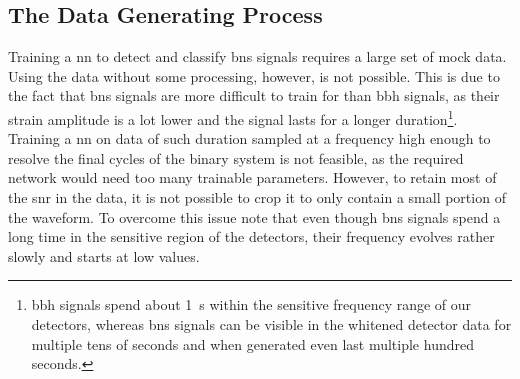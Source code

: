 \subsection{The Data Generating Process}\label{sec:data_generating_process}
Training a \gls{nn} to detect and classify \gls{bns} signals requires a large set of mock data. Using the data without some processing, however, is not possible. This is due to the fact that \gls{bns} signals are more difficult to train for than \gls{bbh} signals, as their strain amplitude is a lot lower and the signal lasts for a longer duration\footnote{\gls{bbh} signals spend about \SI{1}{\s} within the sensitive frequency range of our detectors, whereas \gls{bns} signals can be visible in the whitened detector data for multiple tens of seconds \cite{gw170817} and when generated even last multiple hundred seconds.}. Training a \gls{nn} on data of such duration sampled at a frequency high enough to resolve the final cycles of the binary system is not feasible, as the required network would need too many trainable parameters. However, to retain most of the \gls{snr} in the data, it is not possible to crop it to only contain a small portion of the waveform. To overcome this issue note that even though \gls{bns} signals spend a long time in the sensitive region of the detectors, their frequency evolves rather slowly and starts at low values.\\

